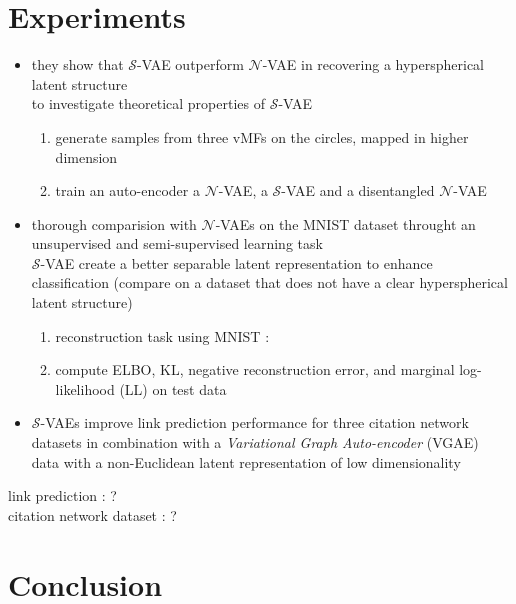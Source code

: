 \documentclass[12pt]{article}
\newcommand{\n}{\mathcal{N}} %
\newcommand{\Ss}{\mathcal{S}} %
\begin{document}
\section{Experiments}

\begin{itemize}
    \item they show that $\mathcal{S}$-VAE outperform $\mathcal{N}$-VAE in recovering a hyperspherical latent structure \\ 
        to investigate theoretical properties of $\mathcal{S}$-VAE \\ 
        \begin{enumerate}
            \item generate samples from three vMFs on the circles, mapped in higher dimension 
            \item train an auto-encoder a $\n$-VAE, a $\Ss$-VAE and a disentangled $\n$-VAE
        \end{enumerate}
    \item thorough comparision with $\mathcal{N}$-VAEs on the MNIST dataset throught an unsupervised and semi-supervised learning task \\
            $\mathcal{S}$-VAE create a better separable latent representation to enhance classification
            (compare on a dataset that does not have a clear hyperspherical latent structure)
            \begin{enumerate}
                \item reconstruction task using MNIST : 
                \item compute ELBO, KL, negative reconstruction error, and marginal log-likelihood (LL) on test data
            \end{enumerate}
                
    \item $\mathcal{S}$-VAEs improve link prediction performance for three citation network datasets in combination with a \textit{Variational Graph Auto-encoder} (VGAE) \\
            data with a non-Euclidean latent representation of low dimensionality 
\end{itemize}


link prediction : ? \\ 
citation network dataset : ?


\section{Conclusion}
\end{document}

